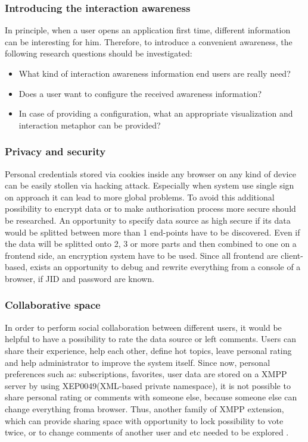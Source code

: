 		\subsubsection {Introducing the interaction awareness}
		In principle, when a user opens an application first time, different information can be interesting for him. Therefore, to introduce a convenient awareness, the following research questions should be investigated:
		 \begin{itemize}
		\item What kind of interaction awareness information end users are really need?
		\item Does a user want to configure the received awareness information?
		\item In case of providing a configuration, what an appropriate visualization and interaction metaphor can be provided? 
		\end{itemize}

		\subsubsection{Privacy and security}
		Personal credentials stored via cookies inside any browser on any kind of device can be easily stollen via hacking attack. Especially when system use single sign on approach it can lead to more global problems. To avoid this additional possibility to encrypt data or to make authorisation process more secure should be researched.
        \newline
        An opportunity to specify data source as high secure if its data would be splitted between more than 1 end-points have to be discovered. Even if the data will be splitted onto 2, 3 or more parts and then combined to one on a frontend side, an encryption system have to be used. Since all frontend are client-based, exists an opportunity to debug and rewrite everything from a console of a browser, if JID and password are known.

        \subsubsection{Collaborative space}
         In order to perform social collaboration between different users, it would be helpful to have a possibility to rate the data source or left comments. Users can share their experience, help each other, define hot topics, leave personal rating and help administrator to improve the system itself. Since now, personal preferences such as: subscriptions, favorites, user data are stored on a XMPP server by using XEP0049(XML-based private namespace), it is not possible to share personal rating or comments with someone else, because someone else can change everything froma  browser. Thus, another family of XMPP extension, which can provide sharing space with opportunity to lock possibility to vote twice, or to change comments of another user and etc needed to be explored .  

